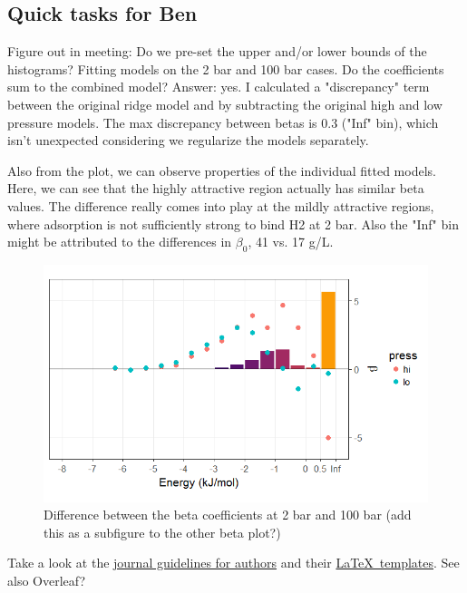 \documentclass[letterpaper]{article}
\begin{document}
\subsection{Quick tasks for Ben}
\begin{outline}
	\1 Figure out in meeting: Do we pre-set the upper and/or lower bounds of the histograms?
	\1 Fitting models on the 2 bar and 100 bar cases.  Do the coefficients sum to the combined model?
		\2 Answer: yes.  I calculated a "discrepancy" term between the original ridge model and by subtracting the original high and low pressure models.  The max discrepancy between betas is 0.3 ("Inf" bin), which isn't unexpected considering we regularize the models separately.
		
		Also from the plot, we can observe properties of the individual fitted models.  Here, we can see that the highly attractive region actually has similar beta values.  The difference really comes into play at the mildly attractive regions, where adsorption is not sufficiently strong to bind H2 at 2 bar.  Also the "Inf" bin might be attributed to the differences in $\beta_0$, 41 vs. 17 g/L.
		\begin{figure}[H]
			\centering
			\includegraphics[width=0.75\columnwidth]{Figs/beta_vs_pressure.png}
			\caption{Difference between the beta coefficients at 2 bar and 100 bar (add this as a subfigure to the other beta plot?)}
			\label{fig:diff_betas}
		\end{figure}
	\1 Take a look at the \href{http://www.rsc.org/journals-books-databases/about-journals/molecular-systems-design-engineering/#undefined}{journal guidelines for authors} and their \href{http://www.rsc.org/journals-books-databases/journal-authors-reviewers/author-tools-services/#article-templates}{\LaTeX~templates}.  See also Overleaf?
\end{outline}
\end{document}
